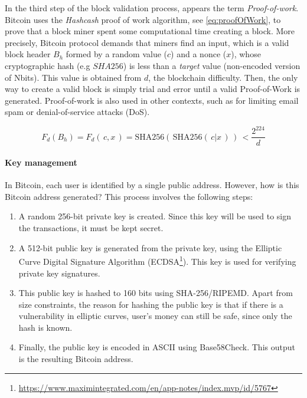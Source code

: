 In the third step of the block validation process, appears the term \textit{Proof-of-work}. Bitcoin uses the \textit{Hashcash} proof of work algorithm, see \eqref{eq:proofOfWork}, to prove that a block miner spent some computational time creating a block. More precisely, Bitcoin protocol demands that miners find an input, which is a valid block header $B_h$ formed by a random value ($c$) and a nonce ($x$), whose cryptographic hash (e.g $SHA256$) is less than a \textit{target} value (non-encoded version of Nbits). This value is obtained from $d$, the blockchain difficulty. Then, the only way to create a valid block is simply trial and error until a valid Proof-of-Work is generated. Proof-of-work is also used in other contexts, such as for limiting email spam or denial-of-service attacks (DoS).

\begin{equation} \label{eq:proofOfWork}
 F_d(B_h) = F_d( \,c,x \,) = \text{SHA256}( \, \text{SHA256}( \, c|x \,) \,)\, < \frac{2^{224}}{d}
\end{equation}

\paragraph{Key management}

In Bitcoin, each user is identified by a single public address. However, how is this Bitcoin address generated? This process involves the following steps:

\begin{enumerate}
	
	\item A random 256-bit private key is created. Since this key will be used to sign the transactions, it must be kept secret.
	\item A 512-bit public key is generated from the private key, using the Elliptic Curve Digital Signature Algorithm (ECDSA\footnote{\url{https://www.maximintegrated.com/en/app-notes/index.mvp/id/5767}}). This key is used for verifying private key signatures.
	\item This public key is hashed to 160 bits using SHA-256/RIPEMD. Apart from size constraints, the reason for hashing the public key is that if there is a vulnerability in elliptic curves, user's money can still be safe, since only the hash is known.
	\item Finally, the public key is encoded in ASCII using Base58Check. This output is the resulting Bitcoin address.
	
\end{enumerate}

